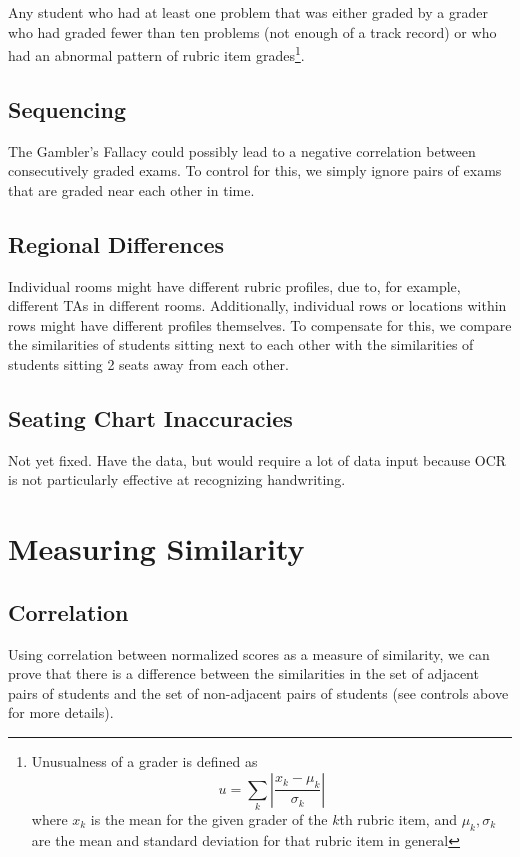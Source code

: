 \documentclass{article}
\begin{document}
        Any student who had at least one problem that was either graded by a grader who had graded fewer
            than ten problems (not enough of a track record) or who had an abnormal pattern of rubric item
            grades\footnote{Unusualness of a grader is defined as
                $$u = \sum_k \left|\frac{x_k - \mu_k}{\sigma_k}\right|$$ where $x_k$ is the mean for the
                given grader of the $k$th rubric item, and $\mu_k, \sigma_k$ are the mean and standard
                deviation for that rubric item in general}.
    \subsection{Sequencing}
        The Gambler's Fallacy could possibly lead to a negative correlation between consecutively graded
            exams. To control for this, we simply ignore pairs of exams that are graded near each other in
            time.
    \subsection{Regional Differences}
        Individual rooms might have different rubric profiles, due to, for example, different TAs in
            different rooms. Additionally, individual rows or locations within rows might have
            different profiles themselves. To compensate for this, we compare the similarities of
            students sitting next to each other with the similarities of students sitting 2 seats
            away from each other.
    \subsection{Seating Chart Inaccuracies}
        Not yet fixed. Have the data, but would require a lot of data input because OCR is not particularly
            effective at recognizing handwriting.
\section{Measuring Similarity}
    \subsection{Correlation}
        Using correlation between normalized scores as a measure of similarity, we can prove that
            there is a difference between the similarities in the set of adjacent pairs of students
            and the set of non-adjacent pairs of students (see controls above for more details).
\end{document}
